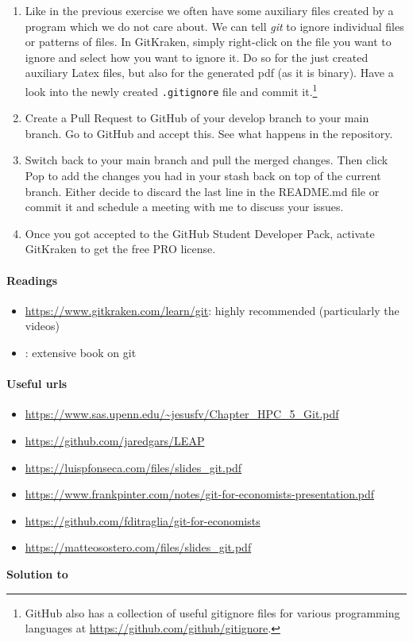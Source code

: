 \begin{enumerate}
\item
Like in the previous exercise we often have some auxiliary files created by a program which we do not care about.
We can tell \emph{git} to ignore individual files or patterns of files.
In GitKraken, simply right-click on the file you want to ignore and select how you want to ignore it.
Do so for the just created auxiliary Latex files, but also for the generated pdf (as it is binary).
Have a look into the newly created \texttt{.gitignore} file and commit it.\footnote{%
  GitHub also has a collection of useful gitignore files for various programming languages at \url{https://github.com/github/gitignore}.
}

\item
Create a Pull Request to GitHub of your develop branch to your main branch. Go to GitHub and accept this.
See what happens in the repository.

\item
Switch back to your main branch and pull the merged changes.
Then click Pop to add the changes you had in your stash back on top of the current branch.
Either decide to discard the last line in the README.md file or commit it and schedule a meeting with me to discuss your issues.

\item
Once you got accepted to the GitHub Student Developer Pack, activate GitKraken to get the free PRO license.

\end{enumerate}


\paragraph{Readings}
\begin{itemize}
\item \url{https://www.gitkraken.com/learn/git}: highly recommended (particularly the videos)
\item \textcite{Chacon_2014_ProGit}: extensive book on git
\end{itemize}

\paragraph{Useful urls}
\begin{itemize}	
\item \url{https://www.sas.upenn.edu/~jesusfv/Chapter_HPC_5_Git.pdf}
\item \url{https://github.com/jaredgars/LEAP}
\item \url{https://luispfonseca.com/files/slides_git.pdf}
\item \url{https://www.frankpinter.com/notes/git-for-economists-presentation.pdf}
\item \url{https://github.com/fditraglia/git-for-economists}
\item \url{https://matteosostero.com/files/slides_git.pdf}
\end{itemize}

\begin{solution}\textbf{Solution to }
\ifDisplaySolutions%

\fi
\newpage
\end{solution}
